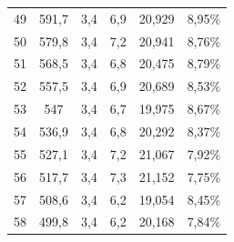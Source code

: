 \begin{longtable}{cccccc}
  49          & 591,7                & 3,4           & 6,9            & 20,929        & 8,95\%                          \\
  50          & 579,8                & 3,4           & 7,2            & 20,941        & 8,76\%                          \\
  51          & 568,5                & 3,4           & 6,8            & 20,475        & 8,79\%                          \\
  52          & 557,5                & 3,4           & 6,9            & 20,689        & 8,53\%                          \\
  53          & 547                  & 3,4           & 6,7            & 19,975        & 8,67\%                          \\
  54          & 536,9                & 3,4           & 6,8            & 20,292        & 8,37\%                          \\
  55          & 527,1                & 3,4           & 7,2            & 21,067        & 7,92\%                          \\
  56          & 517,7                & 3,4           & 7,3            & 21,152        & 7,75\%                          \\
  57          & 508,6                & 3,4           & 6,2            & 19,054        & 8,45\%                          \\
  58          & 499,8                & 3,4           & 6,2            & 20,168        & 7,84\%                          \\
\end{longtable}


